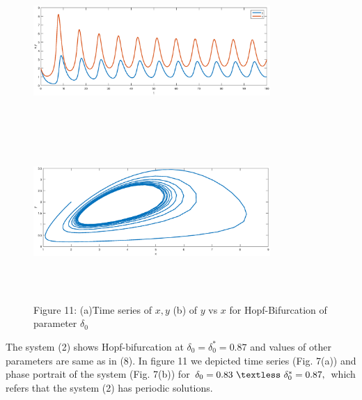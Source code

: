 \documentclass[a4paper, 10pt]{article}
\begin{document}
\begin{figure}[H]
	{\includegraphics[width=9cm, height=6cm]{18a.eps}}
	\endminipage\hfill
	{\includegraphics[width=9cm, height=6cm]{18b.eps}}
	\endminipage\hfill
	\begin{center} Figure 11: (a)Time series of $x,y$  (b)  of $y$ vs $x$ for Hopf-Bifurcation of parameter $\delta_0$   \end{center}
\end{figure}
The system (2) shows Hopf-bifurcation at $\delta_0=\delta_0^*=0.87$ and values of other parameters are same as in (8). In figure 11 we depicted time series (Fig. 7(a)) and phase portrait of the system (Fig. 7(b)) for $\delta_0=0.83~\textless~\delta_0^*=0.87,$ which refers that the system (2) has periodic solutions.
\end{document}
